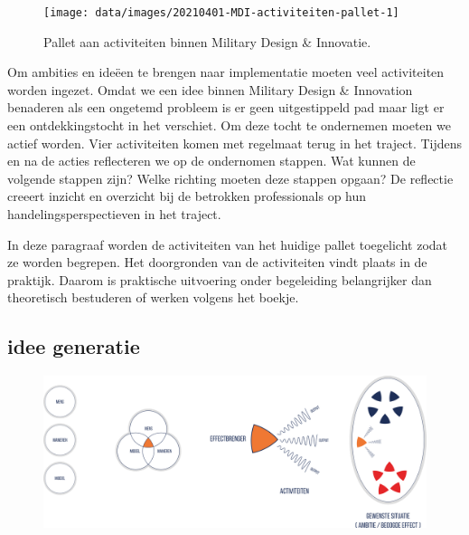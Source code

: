\documentclass[
]{book}
\begin{document}
\begin{figure}

{\centering \texttt{[image: data/images/20210401-MDI-activiteiten-pallet-1]} 

}

\caption{Pallet aan activiteiten binnen Military Design \& Innovatie.}\label{fig:unnamed-chunk-7}
\end{figure}

Om ambities en ideëen te brengen naar implementatie moeten veel activiteiten worden ingezet. Omdat we een idee binnen Military Design \& Innovation benaderen als een ongetemd probleem is er geen uitgestippeld pad maar ligt er een ontdekkingstocht in het verschiet. Om deze tocht te ondernemen moeten we actief worden. Vier activiteiten komen met regelmaat terug in het traject. Tijdens en na de acties reflecteren we op de ondernomen stappen. Wat kunnen de volgende stappen zijn? Welke richting moeten deze stappen opgaan? De reflectie creeert inzicht en overzicht bij de betrokken professionals op hun handelingsperspectieven in het traject.

In deze paragraaf worden de activiteiten van het huidige pallet toegelicht zodat ze worden begrepen. Het doorgronden van de activiteiten vindt plaats in de praktijk. Daarom is praktische uitvoering onder begeleiding belangrijker dan theoretisch bestuderen of werken volgens het boekje.

\hypertarget{idee-generatie}{%
\subsection{idee generatie}\label{idee-generatie}}

\begin{figure}

{\centering \includegraphics[width=0.7\linewidth]{data/images/20210401-MDI-ideegeneratie} 

}

\caption{ }\label{fig:unnamed-chunk-8}
\end{figure}
\end{document}
